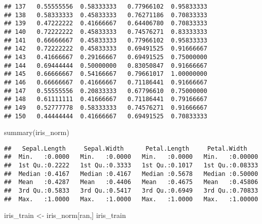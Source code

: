 \documentclass[
]{article}
\newenvironment{Shaded}{\begin{snugshade}}{\end{snugshade}}
\newcommand{\FunctionTok}[1]{\textcolor[rgb]{0.00,0.00,0.00}{#1}}
\newcommand{\NormalTok}[1]{#1}
\newcommand{\OtherTok}[1]{\textcolor[rgb]{0.56,0.35,0.01}{#1}}
\begin{document}
\begin{verbatim}
## 137   0.55555556  0.58333333   0.77966102  0.95833333
## 138   0.58333333  0.45833333   0.76271186  0.70833333
## 139   0.47222222  0.41666667   0.64406780  0.70833333
## 140   0.72222222  0.45833333   0.74576271  0.83333333
## 141   0.66666667  0.45833333   0.77966102  0.95833333
## 142   0.72222222  0.45833333   0.69491525  0.91666667
## 143   0.41666667  0.29166667   0.69491525  0.75000000
## 144   0.69444444  0.50000000   0.83050847  0.91666667
## 145   0.66666667  0.54166667   0.79661017  1.00000000
## 146   0.66666667  0.41666667   0.71186441  0.91666667
## 147   0.55555556  0.20833333   0.67796610  0.75000000
## 148   0.61111111  0.41666667   0.71186441  0.79166667
## 149   0.52777778  0.58333333   0.74576271  0.91666667
## 150   0.44444444  0.41666667   0.69491525  0.70833333
\end{verbatim}

\begin{Shaded}
\begin{Highlighting}[]
\FunctionTok{summary}\NormalTok{(iris\_norm)}
\end{Highlighting}
\end{Shaded}

\begin{verbatim}
##   Sepal.Length     Sepal.Width      Petal.Length     Petal.Width     
##  Min.   :0.0000   Min.   :0.0000   Min.   :0.0000   Min.   :0.00000  
##  1st Qu.:0.2222   1st Qu.:0.3333   1st Qu.:0.1017   1st Qu.:0.08333  
##  Median :0.4167   Median :0.4167   Median :0.5678   Median :0.50000  
##  Mean   :0.4287   Mean   :0.4406   Mean   :0.4675   Mean   :0.45806  
##  3rd Qu.:0.5833   3rd Qu.:0.5417   3rd Qu.:0.6949   3rd Qu.:0.70833  
##  Max.   :1.0000   Max.   :1.0000   Max.   :1.0000   Max.   :1.00000
\end{verbatim}

\begin{Shaded}
\begin{Highlighting}[]
\NormalTok{iris\_train }\OtherTok{\textless{}{-}}\NormalTok{ iris\_norm[ran,]}
\NormalTok{iris\_train}
\end{Highlighting}
\end{Shaded}
\end{document}
